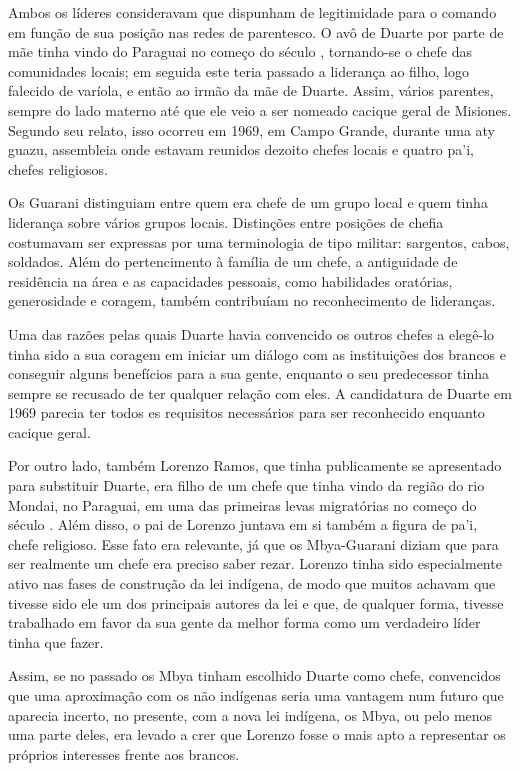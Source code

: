 {{Ambos os líderes consideravam que dispunham de legitimidade para o
comando em função de sua posição nas redes de parentesco. O avô de
Duarte por parte de mãe tinha vindo do Paraguai no começo do século ,
tornando-se o chefe das comunidades locais; em seguida este teria
passado a liderança ao filho, logo falecido de varíola, e então ao
irmão da mãe de Duarte. Assim, vários parentes, sempre do lado materno
até que ele veio a ser nomeado cacique geral de Misiones. Segundo seu
relato, isso ocorreu em 1969, em Campo Grande, durante uma aty guazu,
assembleia onde estavam reunidos dezoito chefes locais e quatro pa’i,
chefes religiosos. 

Os Guarani distinguiam entre quem era chefe de um grupo local e quem
tinha liderança sobre vários grupos locais. Distinções entre posições
de chefia costumavam ser expressas por uma terminologia de tipo
militar: sargentos, cabos, soldados. Além do pertencimento à família de
um chefe, a antiguidade de residência na área e as capacidades
pessoais, como habilidades oratórias, generosidade e coragem, também
contribuíam no reconhecimento de lideranças. 

Uma das razões pelas quais Duarte havia convencido os outros chefes a
elegê-lo tinha sido a sua coragem em iniciar um diálogo com as
instituições dos brancos e conseguir alguns benefícios para a sua
gente, enquanto o seu predecessor tinha sempre se recusado de ter
qualquer relação com eles. A candidatura de Duarte em 1969 parecia ter
todos es requisitos necessários para ser reconhecido enquanto cacique
geral.

Por outro lado, também Lorenzo Ramos, que tinha publicamente se
apresentado para substituir Duarte, era filho de um chefe que tinha
vindo da região do rio Mondai, no Paraguai, em uma das primeiras levas
migratórias no começo do século . Além disso, o pai de Lorenzo
juntava em si também a figura de pa’i, chefe religioso. Esse fato era
relevante, já que os Mbya-Guarani diziam que para ser realmente um
chefe era preciso saber rezar. Lorenzo tinha sido especialmente ativo
nas fases de construção da lei indígena, de modo que muitos achavam que
tivesse sido ele um dos principais autores da lei e que, de qualquer
forma, tivesse trabalhado em favor da sua gente da melhor forma como um
verdadeiro líder tinha que fazer.

Assim, se no passado os Mbya tinham escolhido Duarte como chefe,
convencidos que uma aproximação com os não indígenas seria uma vantagem
num futuro que aparecia incerto, no presente, com a nova lei indígena,
os Mbya, ou pelo menos uma parte deles, era levado a crer que Lorenzo
fosse o mais apto a representar os próprios interesses frente aos
brancos.

}}
